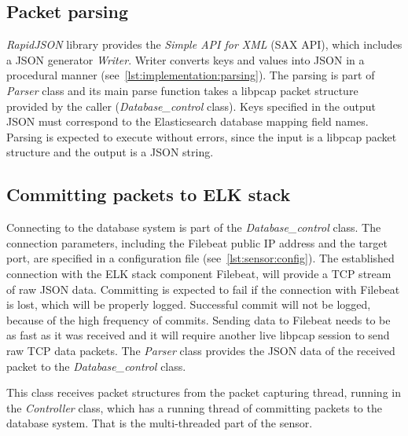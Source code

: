 \documentclass[12pt,a4paper,twoside]{report}
\begin{document}
		\subsection{Packet parsing} \label{implementation:sensor:parse}
			\emph{RapidJSON} library provides the \emph{Simple API for XML} (SAX API), which includes a JSON generator \emph{Writer}. Writer converts keys and values into JSON in a procedural manner (see~\autoref{lst:implementation:parsing}). The parsing is part of \emph{Parser} class and its main parse function takes a libpcap packet structure provided by the caller (\emph{Database\_control} class). Keys specified in the output JSON must correspond to the Elasticsearch database mapping field names. Parsing is expected to execute without errors, since the input is a libpcap packet structure and the output is a JSON string.
			
		\subsection{Committing packets to ELK stack} \label{implementation:sensor:commit}
			Connecting to the database system is part of the \emph{Database\_control} class. The connection parameters, including the Filebeat public IP address and the target port, are specified in a configuration file (see~\autoref{lst:sensor:config}). The established connection with the ELK stack component Filebeat, will provide a TCP stream of raw JSON data. Committing is expected to fail if the connection with Filebeat is lost, which will be properly logged. Successful commit will not be logged, because of the high frequency of commits. Sending data to Filebeat needs to be as fast as it was received and it will require another live libpcap session to send raw TCP data packets. The \emph{Parser} class provides the JSON data of the received packet to the \emph{Database\_control} class.\par
			This class receives packet structures from the packet capturing thread, running in the \emph{Controller} class, which has a running thread of committing packets to the database system. That is the multi-threaded part of the sensor.
\end{document}
